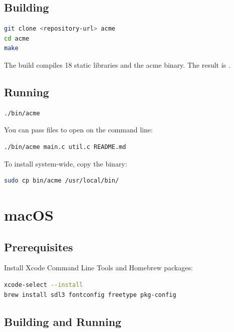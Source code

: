 \subsection{Building}

\begin{lstlisting}[language=bash]
git clone <repository-url> acme
cd acme
make
\end{lstlisting}

The build compiles 18 static libraries and the acme binary.  The result
is .

\subsection{Running}

\begin{lstlisting}[language=bash]
./bin/acme
\end{lstlisting}

You can pass files to open on the command line:

\begin{lstlisting}[language=bash]
./bin/acme main.c util.c README.md
\end{lstlisting}

To install system-wide, copy the binary:

\begin{lstlisting}[language=bash]
sudo cp bin/acme /usr/local/bin/
\end{lstlisting}

\section{macOS}
\label{sec:install-macos}


\subsection{Prerequisites}

Install Xcode Command Line Tools and Homebrew packages:

\begin{lstlisting}[language=bash]
xcode-select --install
brew install sdl3 fontconfig freetype pkg-config
\end{lstlisting}

\subsection{Building and Running}

